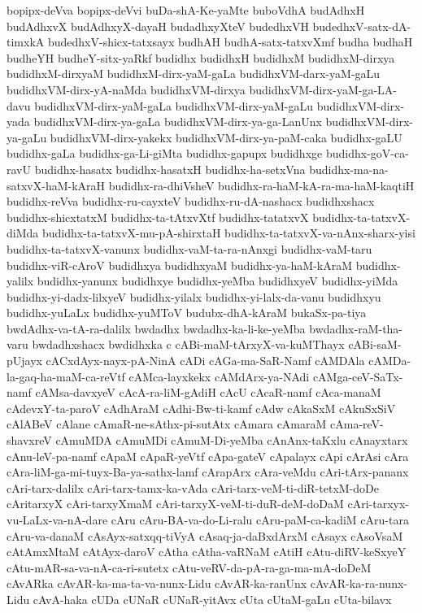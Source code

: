 {bopipx-deVva
bopipx-deVvi
buDa-shA-Ke-yaMte
buboVdhA
budAdhxH
budAdhxvX
budAdhxyX-dayaH
budadhxyXteV
budedhxVH
budedhxV-satx-dA-timxkA
budedhxV-shicx-tatxsayx
budhAH
budhA-satx-tatxvXmf
budha
budhaH
budheYH
budheY-sitx-yaRkf
budidhx
budidhxH
budidhxM
budidhxM-dirxya
budidhxM-dirxyaM
budidhxM-dirx-yaM-gaLa
budidhxVM-darx-yaM-gaLu
budidhxVM-dirx-yA-naMda
budidhxVM-dirxya
budidhxVM-dirx-yaM-ga-LA-davu
budidhxVM-dirx-yaM-gaLa
budidhxVM-dirx-yaM-gaLu
budidhxVM-dirx-yada
budidhxVM-dirx-ya-gaLa
budidhxVM-dirx-ya-ga-LanUnx
budidhxVM-dirx-ya-gaLu
budidhxVM-dirx-yakekx
budidhxVM-dirx-ya-paM-caka
budidhx-gaLU
budidhx-gaLa
budidhx-ga-Li-giMta
budidhx-gapupx
budidhxge
budidhx-goV-ca-ravU
budidhx-hasatx
budidhx-hasatxH
budidhx-ha-setxVna
budidhx-ma-na-satxvX-haM-kAraH
budidhx-ra-dhiVsheV
budidhx-ra-haM-kA-ra-ma-haM-kaqtiH
budidhx-reVva
budidhx-ru-cayxteV
budidhx-ru-dA-nashacx
budidhxshacx
budidhx-shicxtatxM
budidhx-ta-tAtxvXtf
budidhx-tatatxvX
budidhx-ta-tatxvX-diMda
budidhx-ta-tatxvX-mu-pA-shirxtaH
budidhx-ta-tatxvX-va-nAnx-sharx-yisi
budidhx-ta-tatxvX-vanunx
budidhx-vaM-ta-ra-nAnxgi
budidhx-vaM-taru
budidhx-viR-cAroV
budidhxya
budidhxyaM
budidhx-ya-haM-kAraM
budidhx-yalilx
budidhx-yanunx
budidhxye
budidhx-yeMba
budidhxyeV
budidhx-yiMda
budidhx-yi-dadx-lilxyeV
budidhx-yilalx
budidhx-yi-lalx-da-vanu
budidhxyu
budidhx-yuLaLx
budidhx-yuMToV
budubx-dhA-kAraM
bukaSx-pa-tiya
bwdAdhx-va-tA-ra-dalilx
bwdadhx
bwdadhx-ka-li-ke-yeMba
bwdadhx-raM-tha-varu
bwdadhxshacx
bwdidhxka
c
cABi-maM-tArxyX-va-kuMThayx
cABi-saM-pUjayx
cACxdAyx-nayx-pA-NinA
cADi
cAGa-ma-SaR-Namf
cAMDAla
cAMDa-la-gaq-ha-maM-ca-reVtf
cAMca-layxkekx
cAMdArx-ya-NAdi
cAMga-ceV-SaTx-namf
cAMsa-davxyeV
cAcA-ra-liM-gAdiH
cAcU
cAcaR-namf
cAca-manaM
cAdevxY-ta-paroV
cAdhAraM
cAdhi-Bw-ti-kamf
cAdw
cAkaSxM
cAkuSxSiV
cAlABeV
cAlane
cAmaR-ne-sAthx-pi-sutAtx
cAmara
cAmaraM
cAma-reV-shavxreV
cAmuMDA
cAmuMDi
cAmuM-Di-yeMba
cAnAnx-taKxlu
cAnayxtarx
cAnu-leV-pa-namf
cApaM
cApaR-yeVtf
cApa-gateV
cApalayx
cApi
cArAsi
cAra
cAra-liM-ga-mi-tuyx-Ba-ya-sathx-lamf
cArapArx
cAra-veMdu
cAri-tArx-pananx
cAri-tarx-dalilx
cAri-tarx-tamx-ka-vAda
cAri-tarx-veM-ti-diR-tetxM-doDe
cAritarxyX
cAri-tarxyXmaM
cAri-tarxyX-veM-ti-duR-deM-doDaM
cAri-tarxyx-vu-LaLx-va-nA-dare
cAru
cAru-BA-va-do-Li-ralu
cAru-paM-ca-kadiM
cAru-tara
cAru-va-danaM
cAsAyx-satxqq-tiVyA
cAsaq-ja-daBxdArxM
cAsayx
cAsoVsaM
cAtAmxMtaM
cAtAyx-daroV
cAtha
cAtha-vaRNaM
cAtiH
cAtu-diRV-keSxyeY
cAtu-mAR-sa-va-nA-ca-ri-sutetx
cAtu-veRV-da-pA-ra-ga-ma-mA-doDeM
cAvARka
cAvAR-ka-ma-ta-va-nunx-Lidu
cAvAR-ka-ranUnx
cAvAR-ka-ra-nunx-Lidu
cAvA-haka
cUDa
cUNaR
cUNaR-yitAvx
cUta
cUtaM-gaLu
cUta-bilavx
}
